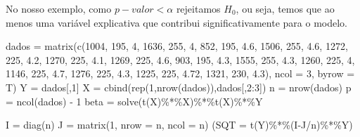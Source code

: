 \documentclass[
]{book}
\newenvironment{Shaded}{\begin{snugshade}}{\end{snugshade}}
\newcommand{\AttributeTok}[1]{\textcolor[rgb]{0.77,0.63,0.00}{#1}}
\newcommand{\DecValTok}[1]{\textcolor[rgb]{0.00,0.00,0.81}{#1}}
\newcommand{\FloatTok}[1]{\textcolor[rgb]{0.00,0.00,0.81}{#1}}
\newcommand{\FunctionTok}[1]{\textcolor[rgb]{0.00,0.00,0.00}{#1}}
\newcommand{\NormalTok}[1]{#1}
\newcommand{\OtherTok}[1]{\textcolor[rgb]{0.56,0.35,0.01}{#1}}
\newcommand{\SpecialCharTok}[1]{\textcolor[rgb]{0.00,0.00,0.00}{#1}}
\begin{document}
No nosso exemplo, como \(p-valor<\alpha\) rejeitamos \(H_0\), ou seja, temos que ao menos uma variável explicativa que contribui significativamente para o modelo.

\begin{Shaded}
\begin{Highlighting}[]
\NormalTok{dados }\OtherTok{=} \FunctionTok{matrix}\NormalTok{(}\FunctionTok{c}\NormalTok{(}\DecValTok{1004}\NormalTok{, }\DecValTok{195}\NormalTok{, }\DecValTok{4}\NormalTok{,}
                 \DecValTok{1636}\NormalTok{, }\DecValTok{255}\NormalTok{, }\DecValTok{4}\NormalTok{,}
                 \DecValTok{852}\NormalTok{, }\DecValTok{195}\NormalTok{, }\FloatTok{4.6}\NormalTok{,}
                 \DecValTok{1506}\NormalTok{, }\DecValTok{255}\NormalTok{, }\FloatTok{4.6}\NormalTok{,}
                 \DecValTok{1272}\NormalTok{, }\DecValTok{225}\NormalTok{, }\FloatTok{4.2}\NormalTok{,}
                 \DecValTok{1270}\NormalTok{, }\DecValTok{225}\NormalTok{, }\FloatTok{4.1}\NormalTok{,}
                 \DecValTok{1269}\NormalTok{, }\DecValTok{225}\NormalTok{, }\FloatTok{4.6}\NormalTok{,}
                 \DecValTok{903}\NormalTok{, }\DecValTok{195}\NormalTok{, }\FloatTok{4.3}\NormalTok{,}
                 \DecValTok{1555}\NormalTok{, }\DecValTok{255}\NormalTok{, }\FloatTok{4.3}\NormalTok{,}
                 \DecValTok{1260}\NormalTok{, }\DecValTok{225}\NormalTok{, }\DecValTok{4}\NormalTok{,}
                 \DecValTok{1146}\NormalTok{, }\DecValTok{225}\NormalTok{, }\FloatTok{4.7}\NormalTok{,}
                 \DecValTok{1276}\NormalTok{, }\DecValTok{225}\NormalTok{, }\FloatTok{4.3}\NormalTok{,}
                 \DecValTok{1225}\NormalTok{, }\DecValTok{225}\NormalTok{, }\FloatTok{4.72}\NormalTok{,}
                 \DecValTok{1321}\NormalTok{, }\DecValTok{230}\NormalTok{, }\FloatTok{4.3}\NormalTok{), }\AttributeTok{ncol =} \DecValTok{3}\NormalTok{, }\AttributeTok{byrow =}\NormalTok{ T)}
\NormalTok{Y }\OtherTok{=}\NormalTok{ dados[,}\DecValTok{1}\NormalTok{]}
\NormalTok{X }\OtherTok{=} \FunctionTok{cbind}\NormalTok{(}\FunctionTok{rep}\NormalTok{(}\DecValTok{1}\NormalTok{,}\FunctionTok{nrow}\NormalTok{(dados)),dados[,}\DecValTok{2}\SpecialCharTok{:}\DecValTok{3}\NormalTok{])}
\NormalTok{n }\OtherTok{=} \FunctionTok{nrow}\NormalTok{(dados)}
\NormalTok{p }\OtherTok{=} \FunctionTok{ncol}\NormalTok{(dados) }\SpecialCharTok{{-}} \DecValTok{1}
\NormalTok{beta }\OtherTok{=} \FunctionTok{solve}\NormalTok{(}\FunctionTok{t}\NormalTok{(X)}\SpecialCharTok{\%*\%}\NormalTok{X)}\SpecialCharTok{\%*\%}\FunctionTok{t}\NormalTok{(X)}\SpecialCharTok{\%*\%}\NormalTok{Y}

\NormalTok{I }\OtherTok{=} \FunctionTok{diag}\NormalTok{(n)}
\NormalTok{J }\OtherTok{=} \FunctionTok{matrix}\NormalTok{(}\DecValTok{1}\NormalTok{, }\AttributeTok{nrow =}\NormalTok{ n, }\AttributeTok{ncol =}\NormalTok{ n)}
\NormalTok{(}\AttributeTok{SQT =} \FunctionTok{t}\NormalTok{(Y)}\SpecialCharTok{\%*\%}\NormalTok{(I}\SpecialCharTok{{-}}\NormalTok{J}\SpecialCharTok{/}\NormalTok{n)}\SpecialCharTok{\%*\%}\NormalTok{Y)}
\end{Highlighting}
\end{Shaded}
\end{document}
